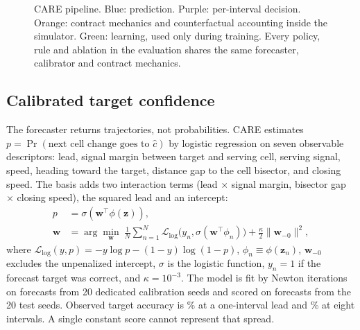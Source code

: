\documentclass[conference]{IEEEtran}
\begin{document}
\begin{figure}[!t]
\caption{CARE pipeline. Blue: prediction. Purple: per-interval decision. Orange: contract mechanics and counterfactual accounting inside the simulator. Green: learning, used only during training. Every policy, rule and ablation in the evaluation shares the same forecaster, calibrator and contract mechanics.}
\label{fig:architecture}
\end{figure}

\subsection{Calibrated target confidence}
The forecaster returns trajectories, not probabilities. CARE estimates $p=\Pr(\text{next cell change goes to }\hat c)$ by logistic regression on seven observable descriptors: lead, signal margin between target and serving cell, serving signal, speed, heading toward the target, distance gap to the cell bisector, and closing speed. The basis adds two interaction terms (lead $\times$ signal margin, bisector gap $\times$ closing speed), the squared lead and an intercept:
\begin{equation}\label{eq:calibration}
\begin{aligned}
p&=\sigma\!\left(\mathbf{w}^{\top}\phi(\mathbf{z})\right),\\
\mathbf{w}&=\arg\min_{\mathbf{w}}\ \frac{1}{N}\sum_{n=1}^{N} \mathcal{L}_{\mathrm{log}}\big(y_n,\sigma(\mathbf{w}^{\top}\phi_n)\big)+\tfrac{\kappa}{2}\|\mathbf{w}_{-0}\|^2,
\end{aligned}
\end{equation}
where $\mathcal{L}_{\mathrm{log}}(y,p)=-y\log p-(1-y)\log(1-p)$, $\phi_n\equiv\phi(\mathbf{z}_n)$, $\mathbf{w}_{-0}$ excludes the unpenalized intercept, $\sigma$ is the logistic function, $y_n=1$ if the forecast target was correct, and $\kappa=10^{-3}$. The model is fit by Newton iterations on \CalFitExamples{} forecasts from 20 dedicated calibration seeds and scored on \CalTestExamples{} forecasts from the 20 test seeds. Observed target accuracy is \CalAccLeadOne\% at a one-interval lead and \CalAccLeadEight\% at eight intervals. A single constant score cannot represent that spread.
\end{document}
